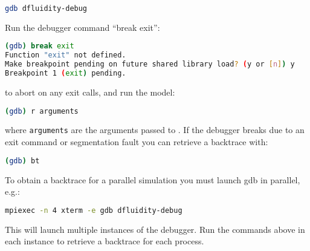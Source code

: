 \begin{lstlisting}[language = Bash]
gdb dfluidity-debug
\end{lstlisting}

Run the debugger command ``break exit'':

\begin{lstlisting}[language = Bash]
(gdb) break exit
Function "exit" not defined.
Make breakpoint pending on future shared library load? (y or [n]) y
Breakpoint 1 (exit) pending.
\end{lstlisting}

to abort on any exit calls, and run the model:

\begin{lstlisting}[language = Bash]
(gdb) r arguments
\end{lstlisting}

where \lstinline[language = Bash]*arguments* are the arguments passed to
\fluidity. If the debugger breaks due to an exit command or segmentation fault
you can retrieve a backtrace with:

\begin{lstlisting}[language = Bash]
(gdb) bt
\end{lstlisting}

To obtain a backtrace for a parallel simulation you must launch gdb in parallel,
e.g.:

\begin{lstlisting}[language = Bash]
mpiexec -n 4 xterm -e gdb dfluidity-debug
\end{lstlisting}

This will launch multiple instances of the debugger. Run the commands above in
each instance to retrieve a backtrace for each process.
